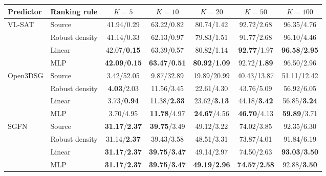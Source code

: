 \clearpage
\noindent
\begin{minipage}{\textwidth}

\centering
{\small
\setlength{\tabcolsep}{3.1pt}
\begin{tabular}{@{}llccccc@{}}
\toprule
Predictor & Ranking rule & \(K=5\) & \(K=10\) & \(K=20\) & \(K=50\) & \(K=100\) \\
\midrule
\multirow{4}{*}{VL-SAT}
 & Source & 41.94/0.29 & 63.22/0.82 & 80.74/1.42 & 92.72/2.68 & 96.35/4.76 \\
 & Robust density & 41.14/0.33 & 62.13/0.97 & 79.83/1.51 & 91.77/2.68 & 96.10/4.46 \\
 & Linear & 42.07/\textbf{0.15} & 63.39/0.57 & 80.82/1.14 & \textbf{92.77}/1.97 & \textbf{96.58}/\textbf{2.95} \\
 & MLP & \textbf{42.09}/\textbf{0.15} & \textbf{63.47}/\textbf{0.51} & \textbf{80.92}/\textbf{1.09} & 92.72/\textbf{1.89} & 96.50/2.96 \\
\midrule
\multirow{4}{*}{Open3DSG}
 & Source & 3.42/52.05 & 9.87/32.89 & 19.89/20.99 & 40.43/13.87 & 51.11/12.42 \\
 & Robust density & \textbf{4.03}/2.03 & 11.56/3.45 & 22.61/4.30 & 43.76/5.09 & 56.92/6.05 \\
 & Linear & 3.73/\textbf{0.94} & 11.38/\textbf{2.33} & 23.62/\textbf{3.13} & 44.18/\textbf{3.42} & 56.85/\textbf{3.24} \\
 & MLP & 3.70/4.95 & \textbf{11.78}/4.97 & \textbf{24.67}/4.56 & \textbf{46.70}/4.13 & \textbf{59.89}/3.71 \\
\midrule
\multirow{4}{*}{SGFN}
 & Source & \textbf{31.17}/\textbf{2.37} & \textbf{39.75}/3.49 & 49.12/3.22 & 74.02/3.85 & 92.35/6.30 \\
 & Robust density & 31.14/\textbf{2.37} & 39.43/3.58 & 48.51/3.31 & 73.87/4.01 & 91.84/6.19 \\
 & Linear & \textbf{31.17}/\textbf{2.37} & \textbf{39.75}/\textbf{3.47} & 49.14/2.97 & 74.50/2.63 & \textbf{93.03}/\textbf{3.50} \\
 & MLP & \textbf{31.17}/\textbf{2.37} & \textbf{39.75}/\textbf{3.47} & \textbf{49.19}/\textbf{2.96} & \textbf{74.57}/\textbf{2.58} & 92.88/\textbf{3.50} \\
\bottomrule
\end{tabular}
}
\label{tab:simple-baseline}
\vspace{0.20\baselineskip}


\end{minipage}
